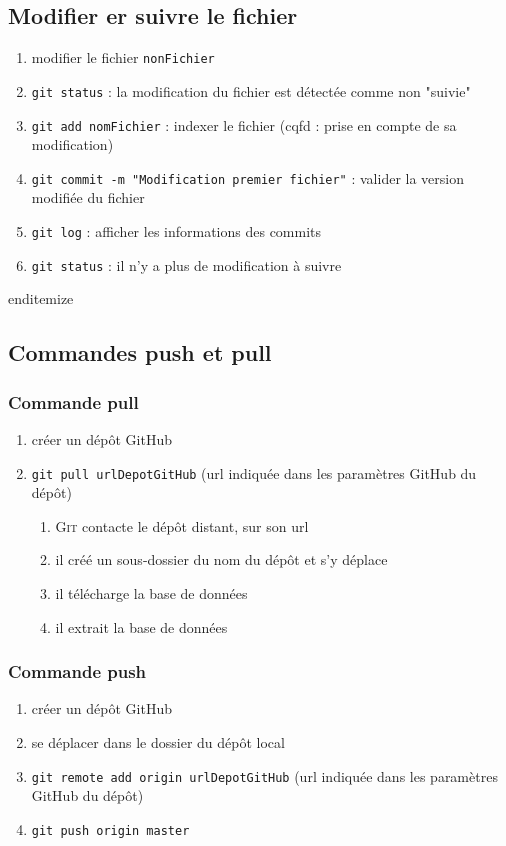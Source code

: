 \documentclass[11pt,twoside,headings=normal,open=right,french,DIV=12]{scrreprt}
\newcommand{\git}{\textsc{Git}}
\begin{document}
\subsection{Modifier er suivre le fichier}



\begin{enumerate}
\item modifier le fichier \verb|nonFichier|
\item \verb|git status|  : la modification du fichier est détectée comme non "suivie"
\item \verb|git add nomFichier| : indexer le fichier (cqfd : prise en compte de sa modification)
\item \verb|git commit -m "Modification premier fichier"| : valider la version modifiée du fichier
\item \verb|git log| : afficher les informations des commits 
\item \verb|git status|  : il n'y a plus de modification à suivre
\end{enumerate}    
end{itemize}



\subsection{Commandes push et pull}



\subsubsection{Commande pull}



\begin{enumerate}
\item créer un dépôt GitHub
\item \verb|git pull urlDepotGitHub| (url indiquée dans les paramètres GitHub du dépôt)
	\begin{enumerate}
	\item \git{} contacte le dépôt distant, sur son url
	\item il créé un sous-dossier du nom du dépôt et s'y déplace
	\item il télécharge la base de données
	\item il extrait la base de données
	\end{enumerate}
\end{enumerate}    



\subsubsection{Commande push}



\begin{enumerate}
\item créer un dépôt GitHub
\item se déplacer dans le dossier du dépôt local
\item \verb|git remote add origin urlDepotGitHub| (url indiquée dans les paramètres GitHub du dépôt)
\item \verb|git push origin master|
\end{enumerate}  



 
 
\end{document}
